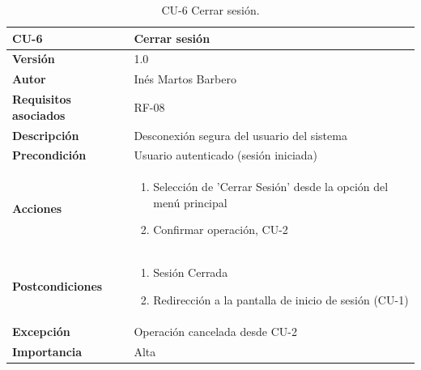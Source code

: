 \begin{table}[p]
	\centering
	\begin{tabularx}{\linewidth}{ p{} p{} }
		\toprule
		\textbf{CU-6}    & \textbf{Cerrar sesión}\\
		\toprule
		\textbf{Versión}              & 1.0    \\
		\textbf{Autor}                & Inés Martos Barbero \\
		\textbf{Requisitos asociados} & RF-08 \\
		\textbf{Descripción}          & Desconexión segura del usuario del sistema \\
		\textbf{Precondición}         & Usuario autenticado (sesión iniciada) \\
		\textbf{Acciones}             &
		\begin{enumerate}
			\def\labelenumi{\arabic{enumi}.}
			\tightlist
			\item Selección de 'Cerrar Sesión' desde la opción del menú principal
			\item Confirmar operación, CU-2
		\end{enumerate}\\
		\textbf{Postcondiciones}        & 
            \begin{enumerate}
			\def\labelenumi{\arabic{enumi}.}
			\tightlist
			\item Sesión Cerrada
			\item Redirección a la pantalla de inicio de sesión (CU-1)
		\end{enumerate}\\
		\textbf{Excepción}          & Operación cancelada desde CU-2  \\
		\textbf{Importancia}          & Alta  \\
		\bottomrule
	\end{tabularx}
	\caption{CU-6 Cerrar sesión.}
    \label{CU-6}
\end{table}

